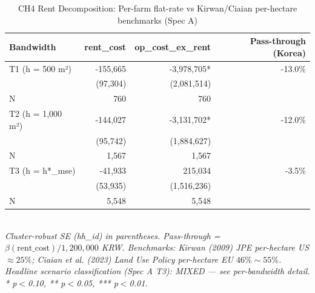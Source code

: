 \begin{table}[t]
\centering
\caption{CH4 Rent Decomposition: Per-farm flat-rate vs Kirwan/Ciaian per-hectare benchmarks (Spec A)}
\label{tab:ch4_rent_en}
\begin{tabular}{lrrr}
\toprule
Bandwidth & rent\_cost & op\_cost\_ex\_rent & Pass-through (Korea) \\
\midrule
T1 (h = 500 m²) & -155,665 & -3,978,705* & -13.0\% \\
        & (97,304) & (2,081,514) & \\
N       & 760 & 760 & \\
T2 (h = 1,000 m²) & -144,027 & -3,131,702* & -12.0\% \\
        & (95,742) & (1,884,627) & \\
N       & 1,567 & 1,567 & \\
T3 (h = h*_mse) & -41,933 & 215,034 & -3.5\% \\
        & (53,935) & (1,516,236) & \\
N       & 5,548 & 5,548 & \\
\bottomrule
\end{tabular}
\\
\footnotesize\textit{Cluster-robust SE (hh\_id) in parentheses. Pass-through = $\beta(\text{rent\_cost}) / 1{,}200{,}000$ KRW. Benchmarks: Kirwan (2009) JPE per-hectare US $\approx 25\%$; Ciaian et al. (2023) Land Use Policy per-hectare EU $46\% \sim 55\%$. Headline scenario classification (Spec A T3): MIXED — see per-bandwidth detail. * p$<$0.10, ** p$<$0.05, *** p$<$0.01.}
\end{table}

